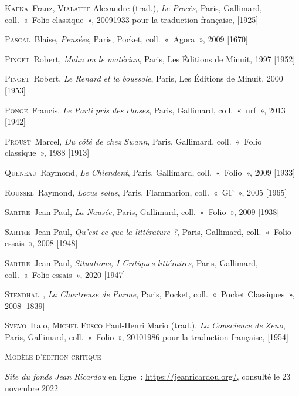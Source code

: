 \documentclass[12pt, a4paper]{article}
\begin{document}
    \textsc{Kafka}~Franz, \textsc{Vialatte} Alexandre (trad.), \textit{Le Procès}, Paris, Gallimard, coll.~«~Folio classique~», 20091933 pour la traduction française,  [1925]\par 
    \textsc{Pascal}~Blaise, \textit{Pensées}, Paris, Pocket, coll.~«~Agora~», 2009 [1670]\par 
    \textsc{Pinget}~Robert, \textit{Mahu ou le matériau}, Paris, Les Éditions de Minuit, 1997 [1952]\par 
    \textsc{Pinget}~Robert, \textit{Le Renard et la boussole}, Paris, Les Éditions de Minuit, 2000 [1953]\par 
    \textsc{Ponge}~Francis, \textit{Le Parti pris des choses}, Paris, Gallimard, coll.~«~nrf~», 2013 [1942]\par 
    \textsc{Proust}~Marcel, \textit{Du côté de chez Swann}, Paris, Gallimard, coll.~«~Folio classique~», 1988 [1913]\par 
    \textsc{Queneau}~Raymond, \textit{Le Chiendent}, Paris, Gallimard, coll.~«~Folio~», 2009 [1933]\par 
    \textsc{Roussel}~Raymond, \textit{Locus solus}, Paris, Flammarion, coll.~«~GF~», 2005 [1965]\par 
    \textsc{Sartre}~Jean-Paul, \textit{La Nausée}, Paris, Gallimard, coll.~«~Folio~», 2009 [1938]\par 
    \textsc{Sartre}~Jean-Paul, \textit{Qu'est-ce que la littérature ?}, Paris, Gallimard, coll.~«~Folio essais~», 2008 [1948]\par 
    \textsc{Sartre}~Jean-Paul, \textit{Situations, I Critiques littéraires}, Paris, Gallimard, coll.~«~Folio essais~», 2020 [1947]\par 
    \textsc{Stendhal}~, \textit{La Chartreuse de Parme}, Paris, Pocket, coll.~«~Pocket Classiques~», 2008 [1839]\par 
    \textsc{Svevo}~Italo, \textsc{Michel Fusco} Paul-Henri Mario (trad.), \textit{La Conscience de Zeno}, Paris, Gallimard, coll.~«~Folio~», 20101986 pour la traduction française,  [1954]\par 
    
        \vspace*{2cm}
        \setlength{\parindent}{0cm}
{\large\textsc{Modèle d'édition critique}}
        \vspace*{1cm}
        \setlength{\parindent}{25pt}
        
        
        

        
        
        \textit{Site du fonds Jean Ricardou} en ligne~: \hyperlink{https://jeanricardou.org/}{https://jeanricardou.org/}, consulté le 23 novembre 2022\par
\end{document}

